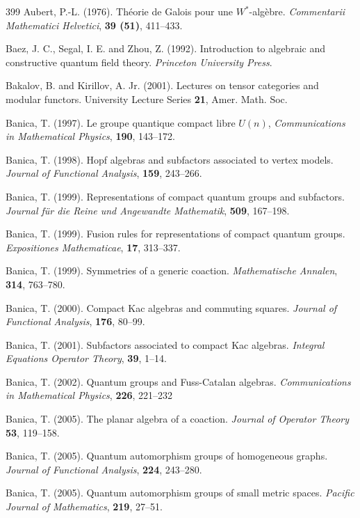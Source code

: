 \documentclass[12pt]{article}
\theoremstyle{plain}
\theoremstyle{definition}
\numberwithin{equation}{section}
\begin{document}
\begin{thebibliography} {399}
Aubert, P.-L. (1976). Th\'eorie de Galois pour une $W^*$-alg\`ebre. {\em Commentarii Mathematici Helvetici},
{\bf 39 (51)},  411--433.

Baez, J. C., Segal, I. E. and Zhou, Z. (1992). Introduction to algebraic and constructive quantum
field theory. {\em Princeton University Press}.

Bakalov, B. and Kirillov, A. Jr. (2001). Lectures on tensor categories and modular functors.
University Lecture Series {\bf 21}, Amer. Math. Soc.

Banica, T. (1997). Le groupe quantique compact libre $U(n)$, {\em Communications in Mathematical Physics}, {\bf 190},
143--172.

Banica, T. (1998). Hopf algebras and subfactors associated to vertex models.
{\em Journal of Functional Analysis}, {\bf 159},  243--266.

Banica, T. (1999). Representations of compact quantum groups and subfactors.
{\em Journal f\"ur die Reine und Angewandte Mathematik}, {\bf 509}, 167--198.

Banica, T. (1999). Fusion rules for representations of compact quantum groups.
{\em Expositiones Mathematicae}, {\bf 17}, 313--337.

Banica, T. (1999). Symmetries of a generic coaction. {\em Mathematische Annalen}, {\bf 314}, 763--780.

Banica, T. (2000). Compact Kac algebras and commuting squares.
{\em Journal of Functional Analysis}, {\bf 176},  80--99.

Banica, T. (2001). Subfactors associated to compact Kac algebras.
{\em Integral Equations Operator Theory}, {\bf 39}, 1--14. 

Banica, T. (2002). Quantum groups and Fuss-Catalan algebras. 
{\em Communications in Mathematical Physics}, {\bf 226}, 221--232

Banica, T. (2005). The planar algebra of a coaction. {\em Journal of Operator Theory} {\bf 53}, 119--158.

Banica, T. (2005). Quantum automorphism groups of homogeneous graphs. 
{\em Journal of Functional Analysis}, {\bf 224}, 243--280.

Banica, T. (2005). Quantum automorphism groups of small metric spaces. 
{\em Pacific Journal of Mathematics}, {\bf 219}, 27--51. 


\end{thebibliography}
\end{document}
